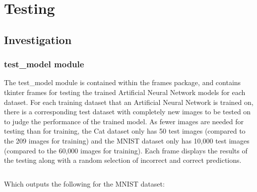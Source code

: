 \documentclass[./project-report/src/latex/project-report.tex]{subfiles}
\begin{document}
\maketitle

\clearpage
\section{Testing}

\subsection{Investigation}

\subsubsection{test\_model module}
\label{sec:test_model-module}

The test\_model module is contained within the frames package, and contains tkinter frames for testing the trained Artificial Neural Network models for each dataset. 
For each training dataset that an Artificial Neural Network is trained on, there is a corresponding test dataset with completely new images to be tested on to judge 
the performance of the trained model. As fewer images are needed for testing than for training, the Cat dataset only has 50 test images (compared to the 209 images 
for training) and the MNIST dataset only has 10,000 test images (compared to the 60,000 images for training).
Each frame displays the results of the testing along with a random selection of incorrect and correct predictions.

\inputminted{python}{./school_project/frames/test_model.py}

Which outputs the following for the MNIST dataset:

\pagebreak

\begin{figure}[h!]
\centering
{}
\end{figure}
\end{document}
